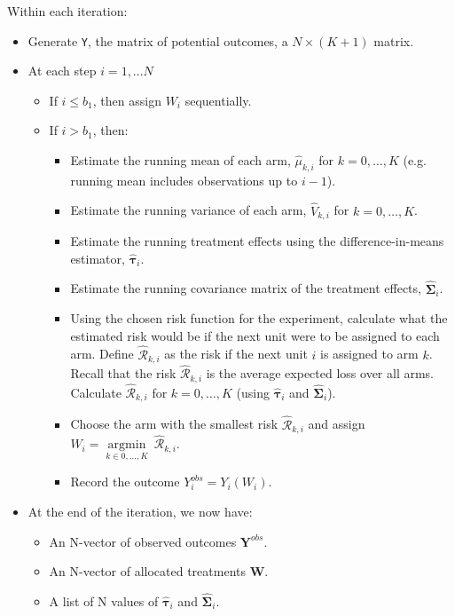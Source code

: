 \documentclass{article}
\newcommand{\bsY}{\boldsymbol Y}
\newcommand{\bsW}{\boldsymbol W}
\newcommand{\hbstau}{\boldsymbol{\hat \tau}}
\newcommand{\bsSig}{\boldsymbol  \Sigma}
\begin{document}
Within each iteration:
\begin{itemize}
    \item Generate \texttt{Y}, the matrix of potential outcomes, a $N \times (K + 1)$ matrix.
    \item At each step $i = 1, \dots N$
    \begin{itemize}
        \item If $i \leq b_1$, then assign $W_i$ sequentially.
        \item If $i > b_1$, then:
        \begin{itemize}
            \item Estimate the running mean of each arm, $\hat{\mu}_{k, i}$ for $k = 0, \dots, K$ (e.g. running mean includes observations up to $i-1$).
            \item Estimate the running variance of each arm, $\hat{V}_{k, i}$ for $k = 0, \dots, K$.
            \item Estimate the running treatment effects using the difference-in-means estimator, $\hbstau_{i}$.
            \item Estimate the running covariance matrix of the treatment effects, $\hat{\bsSig}_i$.
            \item Using the chosen risk function for the experiment, calculate what the estimated risk would be if the next unit were to be assigned to each arm. Define $\hat{\mathcal{R}}_{k,i}$ as the risk if the next unit $i$ is assigned to arm $k$.  Recall that the risk $\hat{\mathcal{R}}_{k,i}$ is the average expected loss over all arms.  Calculate $\hat{\mathcal{R}}_{k,i}$ for $k = 0, \dots, K$ (using $\hbstau_i$ and $\hat{\bsSig}_i$). 
            \item Choose the arm with the smallest risk $\hat{\mathcal{R}}_{k,i}$ and assign $W_i = \underset{k \in 0, \dots, K}{\operatorname{argmin}} \ \hat{\mathcal{R}}_{k,i}$.
            \item Record the outcome $Y_i^{obs} = Y_i(W_i)$.
        \end{itemize}
    \end{itemize}
    \item At the end of the iteration, we now have:
        \begin{itemize}
        \item An N-vector of observed outcomes $\bsY^{obs}$.
        \item An N-vector of allocated treatments $\bsW$.
        \item A list of N values of $\hbstau_{i}$ and $\hat{\bsSig}_i$.
        \end{itemize}
\end{itemize}
\end{document}
